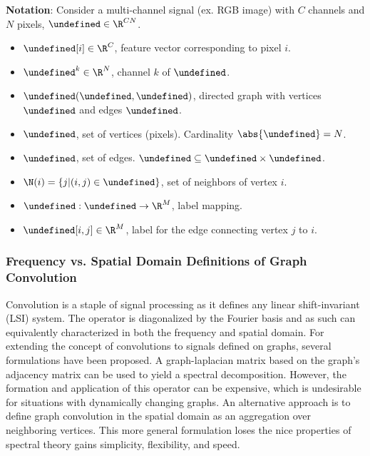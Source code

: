 \documentclass[12pt,a4paper,reqno]{amsart}
\let\bm\undefined
\newcommand{\bm}[1]{\mathbf{#1}}
\let\x\undefined
\newcommand{\x}{\bm{x}}
\let\G\undefined
\newcommand{\G}{\mathcal{G}}
\let\V\undefined
\newcommand{\V}{\mathcal{V}}
\let\E\undefined
\newcommand{\E}{\mathcal{E}}
\let\L\undefined
\newcommand{\L}{\mathcal{L}}
\begin{document}
\textbf{Notation}: Consider a multi-channel signal (ex. RGB image) with 
$C$ channels and $N$ pixels, $\x \in \R^{CN}$. 
\begin{itemize}
\item $\x[i] \in \R^C$, feature vector corresponding to pixel $i$.  \\
\item $\x^k \in \R^N$, channel $k$ of $\x$.  \\
\item $\G(\V,\E)$, directed graph with vertices $\V$ and edges $\E$. \\
\item $\V$, set of vertices (pixels). Cardinality $\abs{\V} = N$. \\
\item $\E$, set of edges. $\E \subseteq \V \times \V$. \\
\item $\N(i) = \{j | (i,j) \in \E \}$, set of neighbors of vertex $i$. \\
\item $\L: \E \rightarrow \R^M$, label mapping.
\item $\L[i,j] \in \R^M$, label for the edge connecting vertex $j$ to $i$.
\end{itemize}

\subsubsection{Frequency vs. Spatial Domain Definitions of Graph Convolution}
Convolution is a staple of signal processing as it defines any linear
shift-invariant (LSI) system. The operator is diagonalized by the Fourier basis
and as such can equivalently characterized in both the frequency and spatial
domain. For extending the concept of convolutions to signals defined on graphs, 
several formulations have been proposed. A graph-laplacian matrix based on the
graph's adjacency matrix can be used to yield a spectral decomposition. However,
the formation and application of this operator can be expensive, which is
undesirable for situations with dynamically changing graphs. An alternative
approach is to define graph convolution in the spatial domain as an aggregation
over neighboring vertices. This more general formulation loses the nice
properties of spectral theory gains simplicity, flexibility, and speed.
\end{document}
